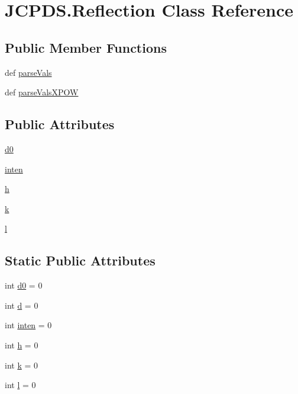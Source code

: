 \hypertarget{class_j_c_p_d_s_1_1_reflection}{\section{J\-C\-P\-D\-S.\-Reflection Class Reference}
\label{class_j_c_p_d_s_1_1_reflection}
}
\subsection*{Public Member Functions}
\begin{DoxyCompactItemize}
\item 
def \hyperlink{class_j_c_p_d_s_1_1_reflection_a60f239e7b0dc01ae22859aab4ce15958}{parse\-Vals}
\item 
def \hyperlink{class_j_c_p_d_s_1_1_reflection_a5b0c369390f0f6c9d4f43f79451666ad}{parse\-Vals\-X\-P\-O\-W}
\end{DoxyCompactItemize}
\subsection*{Public Attributes}
\begin{DoxyCompactItemize}
\item 
\hyperlink{class_j_c_p_d_s_1_1_reflection_a2e19b84f40e3e5dadbe49a60cd45406e}{d0}
\item 
\hyperlink{class_j_c_p_d_s_1_1_reflection_af4298638f38bd63f0731ee0d564f390d}{inten}
\item 
\hyperlink{class_j_c_p_d_s_1_1_reflection_aaab66547bee474122bb66caa9732b683}{h}
\item 
\hyperlink{class_j_c_p_d_s_1_1_reflection_a40102fb28adbda5bc337211845a3a3e3}{k}
\item 
\hyperlink{class_j_c_p_d_s_1_1_reflection_a678d14a1fe67331931242cc73ef096b9}{l}
\end{DoxyCompactItemize}
\subsection*{Static Public Attributes}
\begin{DoxyCompactItemize}
\item 
int \hyperlink{class_j_c_p_d_s_1_1_reflection_a21cdd847ccc4a67939ba0f7eddb288b5}{d0} = 0
\item 
int \hyperlink{class_j_c_p_d_s_1_1_reflection_a343546653e0fa7aa59c9ef63366d6d95}{d} = 0
\item 
int \hyperlink{class_j_c_p_d_s_1_1_reflection_a0122c97dba87bbee7195978f098a6e77}{inten} = 0
\item 
int \hyperlink{class_j_c_p_d_s_1_1_reflection_a9e23ae17c46a767f5b54e8c3f03e48f2}{h} = 0
\item 
int \hyperlink{class_j_c_p_d_s_1_1_reflection_acf1308b53630e8382c97b0d9ebb25bf3}{k} = 0
\item 
int \hyperlink{class_j_c_p_d_s_1_1_reflection_af56bfe0782709d77e267c57b198c3e0a}{l} = 0
\end{DoxyCompactItemize}


